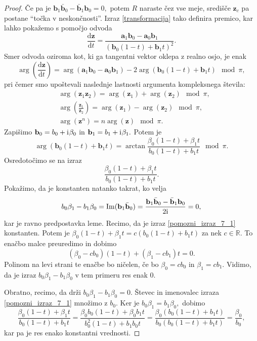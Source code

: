 \documentclass[12pt,a4paper,twoside]{article}
\newcommand{\iu}{\mathrm{i}\mkern1mu} %
\theoremstyle{definition} %
\theoremstyle{plain} %
\theoremstyle{primerstyle}
\numberwithin{equation}{section}  %
\newcommand{\R}{\mathbb R}
\newcommand{\aV}{\mathbf{a}}
\newcommand{\bV}{\mathbf{b}}
\newcommand{\zV}{\mathbf{z}}
\newcommand{\dFrac}[2][t]{\frac{\mathrm{d}#2}{\mathrm{d}#1}} %
\DeclareMathOperator{\ImC}{Im}
\begin{document}
\begin{proof}
	Če pa je $\bV_1\bar{\bV}_0-\bar{\bV}_1\bV_0=0,$ potem $R$ naraste čez vse meje, središče $\zV_c$ pa postane ``točka v neskončnosti''. Izraz \eqref{transformacija} tako definira premico, kar lahko pokažemo s pomočjo odvoda
	\begin{equation*}
		\dFrac{\zV}=\frac{\aV_1\bV_0-\aV_0\bV_1}{(\bV_0(1-t)+\bV_1t)^2}.
	\end{equation*}
	Smer odvoda oziroma kot, ki ga tangentni vektor oklepa z realno osjo, je enak
	\begin{equation*}
	\arg\left(\dFrac{\zV}\right)=\arg(\aV_1\bV_0-\aV_0\bV_1)-2\arg(\bV_0(1-t)+\bV_1t)\mod\pi,
	\end{equation*}
	pri čemer smo upoštevali naslednje lastnosti argumenta kompleksnega števila:
	\begin{align}
		&\arg(\zV_1\zV_2)=\arg(\zV_1)+\arg(\zV_2)\mod\pi,\nonumber\\
		&\arg(\frac{\zV_1}{\zV_2})=\arg(\zV_1)-\arg(\zV_2)\mod\pi,\label{lastnosti_argumenta_C}\\
		&\arg(\zV^n)=n\arg(\zV)\mod\pi.\nonumber
	\end{align}
	Zapišimo $\bV_0=b_0+\iu\beta_0$ in $\bV_1=b_1+\iu\beta_1.$ Potem je
	\begin{equation*}
		\arg(\bV_0(1-t)+\bV_1t)=\arctan\frac{\beta_0(1-t)+\beta_1t}{b_0(1-t)+b_1t}\mod\pi.
	\end{equation*}
	Osredotočimo se na izraz
	\begin{equation}
		\label{pomozni_izraz_7_1}
		\frac{\beta_0(1-t)+\beta_1t}{b_0(1-t)+b_1t}.
	\end{equation}
	Pokažimo, da je konstanten natanko takrat, ko velja $$b_0\beta_1-b_1\beta_0=\ImC(\bV_1\bar{\bV}_0)=\frac{\bV_1\bar{\bV}_0-\bar{\bV}_1\bV_0}{2\iu}=0,$$ kar je ravno predpostavka leme. Recimo, da je izraz \eqref{pomozni_izraz_7_1} konstanten. Potem je $\beta_0(1-t)+\beta_1t=c(b_0(1-t)+b_1t)$ za nek $c\in\R.$ To enačbo malce preuredimo in dobimo
	\begin{equation*}
		(\beta_0-cb_0)(1-t)+(\beta_1-cb_1)t=0.
	\end{equation*}
	Polinom na levi strani te enačbe bo ničelen, če bo $\beta_0=cb_0$ in $\beta_1=cb_1.$ Vidimo, da je izraz $b_0\beta_1-b_1\beta_0$ v tem primeru res enak 0.
	
	Obratno, recimo, da drži $b_0\beta_1-b_1\beta_0=0.$ Števec in imenovalec izraza \eqref{pomozni_izraz_7_1} množimo z $b_0.$ Ker je $b_0\beta_1=b_1\beta_0,$ dobimo
	\begin{equation*}
		\frac{\beta_0(1-t)+\beta_1t}{b_0(1-t)+b_1t}=\frac{\beta_0b_0(1-t)+\beta_0b_1t}{b_0^2(1-t)+b_1b_0t}=\frac{\beta_0(b_0(1-t)+b_1t)}{b_0(b_0(1-t)+b_1t)}=\frac{\beta_0}{b_0},
	\end{equation*}
	kar pa je res enako konstantni vrednosti.
\end{proof}
\end{document}
